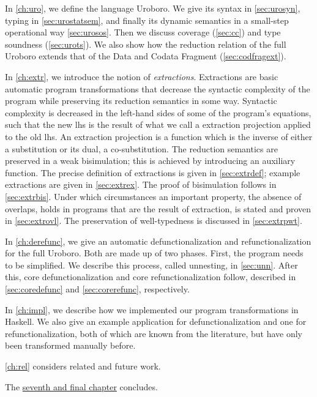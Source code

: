 In \autoref{ch:uro}, we define the language Uroboro. We give its syntax in \autoref{sec:urosyn}, typing in \autoref{sec:urostatsem}, and finally its dynamic semantics in a small-step operational way \autoref{sec:urosos}. Then we discuss coverage (\autoref{sec:cc}) and type soundness (\autoref{sec:urots}). We also show how the reduction relation of the full Uroboro extends that of the Data and Codata Fragment (\autoref{sec:codfragext}).

In \autoref{ch:extr}, we introduce the notion of \textit{extractions}. Extractions are basic automatic program transformations that decrease the syntactic complexity of the program while preserving its reduction semantics in some way. Syntactic complexity is decreased in the left-hand sides of some of the program's equations, such that the new lhs is the result of what we call a extraction projection applied to the old lhs. An extraction projection is a function which is the inverse of either a substitution or its dual, a co-substitution. The reduction semantics are preserved in a weak bisimulation; this is achieved by introducing an auxiliary function. The precise definition of extractions is given in \autoref{sec:extrdef}; example extractions are given in \autoref{sec:extrex}. The proof of bisimulation follows in \autoref{sec:extrbis}. Under which circumstances an important property, the absence of overlaps, holds in programs that are the result of extraction, is stated and proven in \autoref{sec:extrovl}. The preservation of well-typedness is discussed in \autoref{sec:extrpwt}.

In \autoref{ch:derefunc}, we give an automatic defunctionalization and refunctionalization for the full Uroboro. Both are made up of two phases. First, the program needs to be simplified. We describe this process, called unnesting, in \autoref{sec:unn}. After this, core defunctionalization and core refunctionalization follow, described in \autoref{sec:coredefunc} and \autoref{sec:corerefunc}, respectively.

In \autoref{ch:impl}, we describe how we implemented our program transformations in Haskell. We also give an example application for defunctionalization and one for refunctionalization, both of which are known from the literature, but have only been transformed manually before.

\autoref{ch:rel} considers related and future work.

The \hyperref[ch:concl]{seventh and final chapter} concludes.
